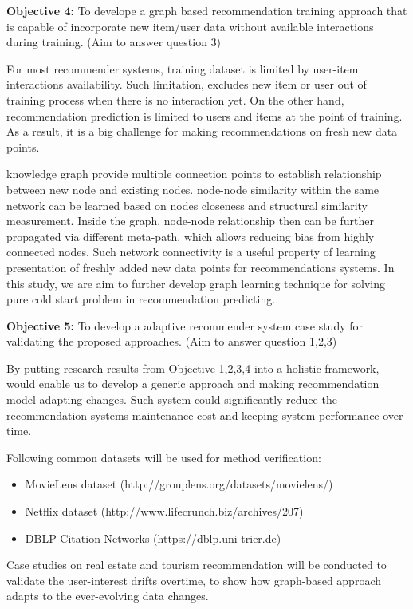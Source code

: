\bigskip
\textbf{Objective 4:} To develope a graph based recommendation training approach that is capable of incorporate new item/user data without available interactions during training. (Aim to answer question 3)

For most recommender systems, training dataset is limited by user-item interactions availability. Such limitation, excludes new item or user out of training process when there is no interaction yet. On the other hand, recommendation prediction is limited to users and items at the point of training. As a result, it is a big challenge for making recommendations on fresh new data points. 

knowledge graph provide multiple connection points to establish relationship between new node and existing nodes. node-node similarity within the same network can be learned based on nodes closeness and structural similarity measurement. Inside the graph, node-node relationship then can be further propagated via different meta-path, which allows reducing bias from highly connected nodes. Such network connectivity is a useful property of learning presentation of freshly added new data points for recommendations systems. In this study, we are aim to further develop graph learning technique for solving pure cold start problem in recommendation predicting.

\bigskip
\textbf{Objective 5:} To develop a adaptive recommender system case study for validating the proposed approaches. (Aim to answer question 1,2,3)

By putting research results from Objective 1,2,3,4 into a holistic framework, would enable us to develop a generic approach and making recommendation model adapting changes. Such system could significantly reduce the recommendation systems maintenance cost and keeping system performance over time. 

Following common datasets will be used for method verification: 

\begin{itemize}

\item MovieLens dataset (http://grouplens.org/datasets/movielens/) 

\item Netflix dataset (http://www.lifecrunch.biz/archives/207) 

\item DBLP Citation Networks (https://dblp.uni-trier.de)  

\end{itemize}

Case studies on real estate and tourism recommendation will be conducted to validate the user-interest drifts overtime, to show how graph-based approach adapts to the ever-evolving data changes. 
